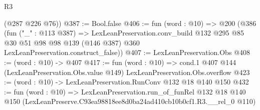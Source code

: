 \begin{lexlean}{R3}
\begin{coremodule}
      (@287 @226 @76))
@387 := Bool.false
@406 := fun (word : @10) =>
  @200
    (@386
      (fun ("_" : @113 @387) =>
      LexLeanPreservation.conv_build
        @132
        @295
        @85
        @30
        @51
        @98
        @98
        @139
        (@146 @387)
        @360
        LexLeanPreservation.construct_false))
@407 := LexLeanPreservation.Obs
@408 := (word : @10) -> @407
@417 := fun (word : @10) =>
  cond.{1} @407 @144 (LexLeanPreservation.Obs.value @149) LexLeanPreservation.Obs.overflow
@423 := (word : @10) -> LexLeanPreservation.RunConv @132 @18 @140 @150
@432 := fun (word : @10) =>
  LexLeanPreservation.run_of_funRel
    @132
    @18
    @140
    @150
    (LexLeanPreserve.C93ea98818ee8d0ba24ad410cb10b0cf1.R3.__rel_0 @110)
\end{coremodule}
\end{lexlean}
